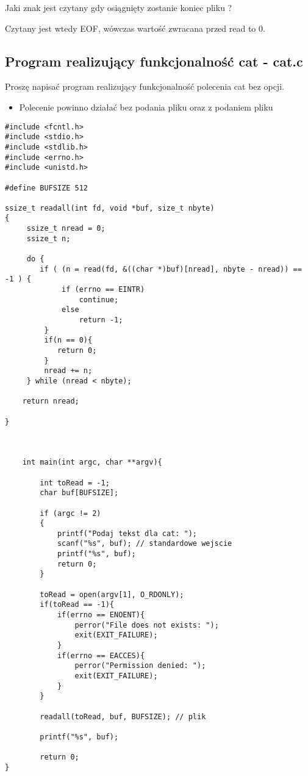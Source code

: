 \documentclass[a4paper,15pt]{article}
\newcommand{\ask}[2]{
    \begin{tcolorbox}[colback=black!5!white,colframe=gray,title={Pytanie #1}]
        #2
    \end{tcolorbox}
}
\newcommand{\assignment}[2]{
    \begin{tcolorbox}[colback=black!5!white,colframe=black,title={Zadanie #1}]
        #2
    \end{tcolorbox}
}
\begin{document}
\ask{}{
Jaki znak jest czytany gdy osiągnięty zostanie koniec pliku ? 
} 
Czytany jest wtedy EOF, wówczas wartość zwracana przed read to 0.

\subsection{Program realizujący funkcjonalność cat - cat.c}


\assignment{}{
Proszę napisać program realizujący funkcjonalność polecenia cat bez opcji. 
\begin{itemize}
\item Polecenie powinno działać bez podania pliku oraz z podaniem pliku
\end{itemize}
}

\begin{lstlisting}[style=CStyle, label=some-code, caption=cat.c]
#include <fcntl.h>
#include <stdio.h>
#include <stdlib.h>
#include <errno.h>
#include <unistd.h>

#define BUFSIZE 512

ssize_t readall(int fd, void *buf, size_t nbyte)
{
     ssize_t nread = 0;
	 ssize_t n;	
	
     do {
		if ( (n = read(fd, &((char *)buf)[nread], nbyte - nread)) == -1 ) {
             if (errno == EINTR)
                 continue;
             else
                 return -1;
         }
		 if(n == 0){
		 	return 0;
		 }
         nread += n;
     } while (nread < nbyte);
     
	return nread;
	
}



    int main(int argc, char **argv){

		int toRead = -1;
		char buf[BUFSIZE];
		
    	if (argc != 2)
    	{
    		printf("Podaj tekst dla cat: ");
			scanf("%s", buf); // standardowe wejscie
			printf("%s", buf);
			return 0;
    	}

        toRead = open(argv[1], O_RDONLY);
    	if(toRead == -1){
            if(errno == ENOENT){
                perror("File does not exists: ");
                exit(EXIT_FAILURE);
            }
            if(errno == EACCES){
                perror("Permission denied: ");
                exit(EXIT_FAILURE);
            }
        }

        readall(toRead, buf, BUFSIZE); // plik
		
		printf("%s", buf);
    	
		return 0;
}
\end{lstlisting}
\end{document}
